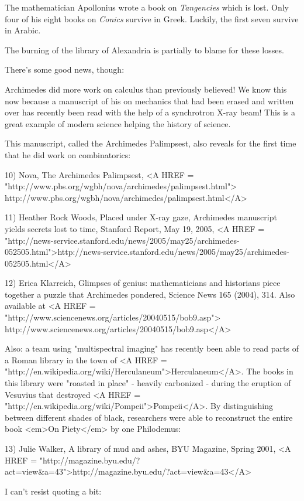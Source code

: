 The mathematician Apollonius wrote a book on \emph{Tangencies} which is lost.
Only four of his eight books on \emph{Conics} survive in Greek.  
Luckily, the first seven survive in Arabic.  

The burning of the library of Alexandria is partially to blame for
these losses.

There's some good news, though:

Archimedes did more work on calculus than previously believed!
We know this now because a manuscript of his on mechanics that had been 
erased and written over has recently been read with the help of a 
synchrotron X-ray beam!  This is a great example of modern science
helping the history of science.  

This manuscript, called the Archimedes Palimpsest, also reveals for 
the first time that he did work on combinatorics:

10) Nova, The Archimedes Palimpsest, 
<A HREF = "http://www.pbs.org/wgbh/nova/archimedes/palimpsest.html">
http://www.pbs.org/wgbh/nova/archimedes/palimpsest.html</A>

11) Heather Rock Woods, Placed under X-ray gaze, Archimedes 
manuscript yields secrets lost to time, Stanford Report, May 19, 2005, 
<A HREF = "http://news-service.stanford.edu/news/2005/may25/archimedes-052505.html">http://news-service.stanford.edu/news/2005/may25/archimedes-052505.html</A>

12) Erica Klarreich, Glimpses of genius: mathematicians and
historians piece together a puzzle that Archimedes pondered,
Science News 165 (2004), 314.  Also available at
<A HREF = "http://www.sciencenews.org/articles/20040515/bob9.asp">
http://www.sciencenews.org/articles/20040515/bob9.asp</A>

Also: a team using "multispectral imaging" has recently been able 
to read parts of a Roman library in the town of 
<A HREF = "http://en.wikipedia.org/wiki/Herculaneum">Herculaneum</A>.  
The books in this library were "roasted in place" -
heavily carbonized - during the eruption of Vesuvius that destroyed 
<A HREF = "http://en.wikipedia.org/wiki/Pompeii">Pompeii</A>. 
By distinguishing between different shades of 
black, researchers were able to reconstruct the entire book <em>On 
Piety</em> by one Philodemus:

13) Julie Walker, A library of mud and ashes, BYU Magazine, Spring
2001, <A HREF = "http://magazine.byu.edu/?act=view&a=43">http://magazine.byu.edu/?act=view&a=43</A>

I can't resist quoting a bit:


